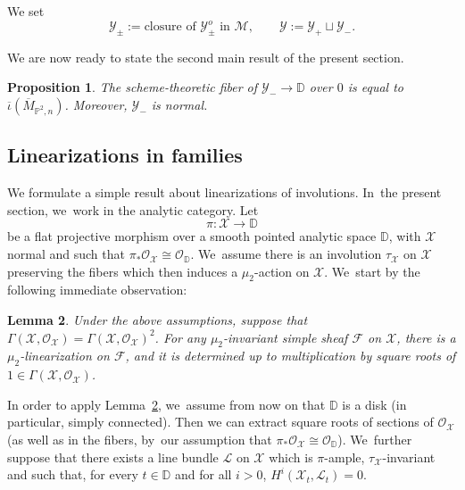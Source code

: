 \documentclass[JEP,XML,SOM,Unicode,published]{cedram}
\newcommand{\DD}{{\mathbb D}}
\newcommand{\PP}{{\mathbb P}}\let\P\PP
\newcommand\cF{\mathcal{F}}
\newcommand\cL{\mathcal{L}}
\newcommand\cM{\mathcal{M}}
\newcommand\cO{\mathcal{O}}
\newcommand\cX{\mathcal{X}}
\newcommand\cY{\mathcal{Y}}
\let\ov\overline
\newtheorem{lemm}{Lemma}[section]
\newtheorem{prop}[lemm]{Proposition}
\theoremstyle{definition}
\begin{document}
We set
\begin{equation*}\label{eq:DefYprimeFamily}
\cY_{\pm} :=\text{closure of $\cY_{\pm}^o$ in $\cM$},\qquad
\cY:=\cY_{+}\sqcup \cY_{-}.
\end{equation*}

We are now ready to state the second main result of the present section.

\begin{prop}\label{prop:negfiber}
The scheme-theoretic fiber of $\cY_{-}\to\DD$ over $0$ is equal to $\ov{\iota}(\ov{M}_{\PP^2,n})$. Moreover, $\cY_{-}$ is normal.
\end{prop}

\subsection{Linearizations in families}\label{subsec:LinearizationFamily}

We formulate a simple result about linearizations of involutions. In~the present section, we~work in the analytic category.
Let
\[
\pi\colon \cX \to \DD
\]
be a flat projective morphism over a smooth pointed analytic space $\DD$, with $\cX$ normal and such that $\pi_{*}{\cO}_{\cX}\cong{\cO}_\DD$. We~assume there is an involution $\tau_{\cX}$ on $\cX$ preserving the fibers which then induces a $\mu_2$-action on $\cX$. We~start by the following immediate observation:

\begin{lemm}\label{lem:LinearizationGeneral}
Under the above assumptions, suppose that $\Gamma(\cX, {\cO}_{\cX})=\Gamma(\cX,{\cO}_{\cX})^2$.
For any $\mu_2$-invariant simple sheaf $\cF$ on $\cX$, there is a $\mu_2$-linearization on $\cF$, and it is determined up to multiplication by square roots of $1\in \Gamma(\cX, {\cO}_{\cX})$.
\end{lemm}

In order to apply Lemma~\ref{lem:LinearizationGeneral}, we~assume from now on that $\DD$ is a disk (in particular, simply connected).
Then we can extract square roots of sections of $\cO_{\cX}$ (as well as in the fibers, by~our assumption that $\pi_{*}{\cO}_{\cX}\cong{\cO}_\DD$). We~further suppose that there exists a line bundle $\cL$ on $\cX$ which is $\pi$-ample, $\tau_{\cX}$-invariant and such that, for every $t\in\DD$ and for all $i>0$, $H^i(\mathcal{X}_t,\mathcal{L}_t)=0$.
\end{document}
